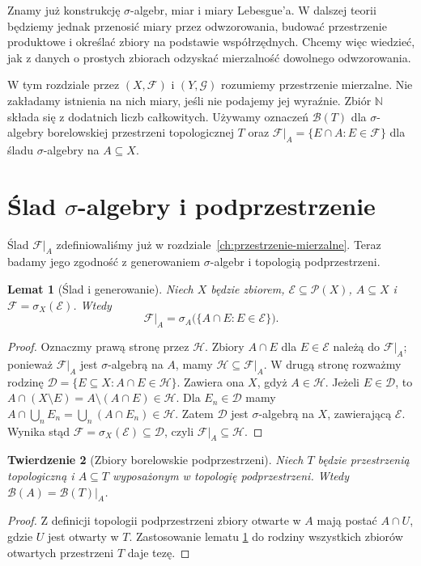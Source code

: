 \documentclass[11pt,a4paper,oneside]{book}
\numberwithin{equation}{chapter}
\theoremstyle{plain}
\newtheorem{twierdzenie}{Twierdzenie}[chapter]
\newtheorem{lemat}[twierdzenie]{Lemat}
\theoremstyle{definition}
\theoremstyle{remark}
\begin{document}
Znamy już konstrukcję $\sigma$-algebr, miar i miary Lebesgue'a.
W dalszej teorii będziemy jednak przenosić miary przez odwzorowania,
budować przestrzenie produktowe i określać zbiory na podstawie
współrzędnych. Chcemy więc wiedzieć, jak z danych o prostych
zbiorach odzyskać mierzalność dowolnego odwzorowania.

W tym rozdziale przez $(X,\mathcal F)$ i $(Y,\mathcal G)$ rozumiemy
przestrzenie mierzalne. Nie zakładamy istnienia na nich miary,
jeśli nie podajemy jej wyraźnie. Zbiór $\mathbb N$ składa się z
dodatnich liczb całkowitych. Używamy oznaczeń
$\mathcal B(T)$ dla $\sigma$-algebry borelowskiej przestrzeni
topologicznej $T$ oraz $\mathcal F|_A=\{E\cap A:E\in\mathcal F\}$
dla śladu $\sigma$-algebry na $A\subseteq X$.

\section{Ślad \texorpdfstring{$\sigma$}{sigma}-algebry i podprzestrzenie}

Ślad $\mathcal F|_A$ zdefiniowaliśmy już w rozdziale~\ref{ch:przestrzenie-mierzalne}.
Teraz badamy jego zgodność z generowaniem $\sigma$-algebr
i topologią podprzestrzeni.


\begin{lemat}[Ślad i generowanie]
\label{lem:trace-generation}
Niech $X$ będzie zbiorem, $\mathcal E\subseteq\mathcal P(X)$,
$A\subseteq X$ i $\mathcal F=\sigma_X(\mathcal E)$.
Wtedy
\[
\mathcal F|_A=\sigma_A\bigl(\{A\cap E:E\in\mathcal E\}\bigr).
\]
\end{lemat}
\begin{proof}
Oznaczmy prawą stronę przez $\mathcal H$. Zbiory
$A\cap E$ dla $E\in\mathcal E$ należą do $\mathcal F|_A$;
ponieważ $\mathcal F|_A$ jest $\sigma$-algebrą na $A$,
mamy $\mathcal H\subseteq\mathcal F|_A$.
W drugą stronę rozważmy rodzinę
$\mathcal D=\{E\subseteq X:A\cap E\in\mathcal H\}$.
Zawiera ona $X$, gdyż $A\in\mathcal H$. Jeżeli
$E\in\mathcal D$, to
$A\cap(X\setminus E)=A\setminus(A\cap E)\in\mathcal H$.
Dla $E_n\in\mathcal D$ mamy
$A\cap\bigcup_nE_n=\bigcup_n(A\cap E_n)\in\mathcal H$.
Zatem $\mathcal D$ jest $\sigma$-algebrą na $X$, zawierającą
$\mathcal E$. Wynika stąd
$\mathcal F=\sigma_X(\mathcal E)\subseteq\mathcal D$, czyli
$\mathcal F|_A\subseteq\mathcal H$.
\end{proof}

\begin{twierdzenie}[Zbiory borelowskie podprzestrzeni]
\label{thm:borel-trace}
Niech $T$ będzie przestrzenią topologiczną i $A\subseteq T$
wyposażonym w topologię podprzestrzeni. Wtedy
$\mathcal B(A)=\mathcal B(T)|_A$.
\end{twierdzenie}
\begin{proof}
Z definicji topologii podprzestrzeni zbiory otwarte w $A$
mają postać $A\cap U$, gdzie $U$ jest otwarty w $T$.
Zastosowanie lematu \ref{lem:trace-generation} do rodziny
wszystkich zbiorów otwartych przestrzeni $T$ daje tezę.
\end{proof}
\end{document}
